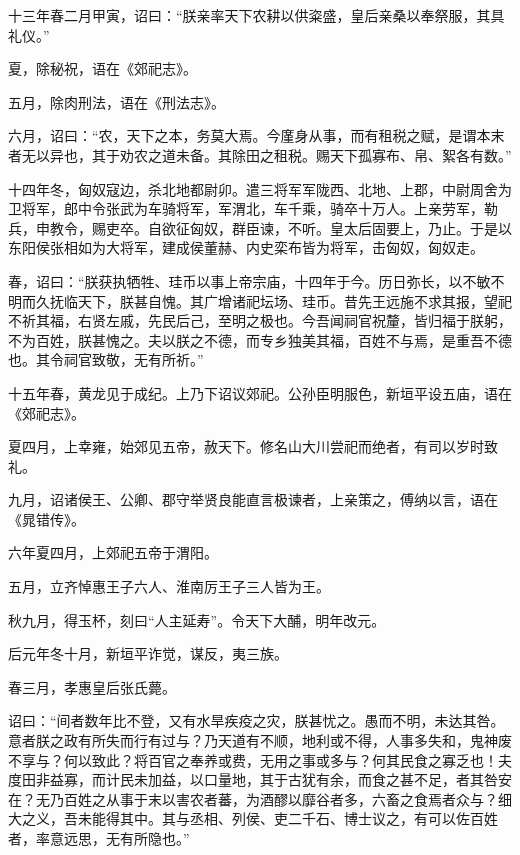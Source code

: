 \documentclass[12pt,UTF8]{ctexbook}
\begin{document}
十三年春二月甲寅，诏曰：“朕亲率天下农耕以供粢盛，皇后亲桑以奉祭服，其具礼仪。”



夏，除秘祝，语在《郊祀志》。



五月，除肉刑法，语在《刑法志》。



六月，诏曰：“农，天下之本，务莫大焉。今廑身从事，而有租税之赋，是谓本末者无以异也，其于劝农之道未备。其除田之租税。赐天下孤寡布、帛、絮各有数。”



十四年冬，匈奴寇边，杀北地都尉卯。遣三将军军陇西、北地、上郡，中尉周舍为卫将军，郎中令张武为车骑将军，军渭北，车千乘，骑卒十万人。上亲劳军，勒兵，申教令，赐吏卒。自欲征匈奴，群臣谏，不听。皇太后固要上，乃止。于是以东阳侯张相如为大将军，建成侯董赫、内史栾布皆为将军，击匈奴，匈奴走。



春，诏曰：“朕获执牺牲、珪币以事上帝宗庙，十四年于今。历日弥长，以不敏不明而久抚临天下，朕甚自愧。其广增诸祀坛场、珪币。昔先王远施不求其报，望祀不祈其福，右贤左戚，先民后己，至明之极也。今吾闻祠官祝釐，皆归福于朕躬，不为百姓，朕甚愧之。夫以朕之不德，而专乡独美其福，百姓不与焉，是重吾不德也。其令祠官致敬，无有所祈。”



十五年春，黄龙见于成纪。上乃下诏议郊祀。公孙臣明服色，新垣平设五庙，语在《郊祀志》。



夏四月，上幸雍，始郊见五帝，赦天下。修名山大川尝祀而绝者，有司以岁时致礼。



九月，诏诸侯王、公卿、郡守举贤良能直言极谏者，上亲策之，傅纳以言，语在《晁错传》。



六年夏四月，上郊祀五帝于渭阳。



五月，立齐悼惠王子六人、淮南厉王子三人皆为王。



秋九月，得玉杯，刻曰“人主延寿”。令天下大酺，明年改元。



后元年冬十月，新垣平诈觉，谋反，夷三族。



春三月，孝惠皇后张氏薨。



诏曰：“间者数年比不登，又有水旱疾疫之灾，朕甚忧之。愚而不明，未达其咎。意者朕之政有所失而行有过与？乃天道有不顺，地利或不得，人事多失和，鬼神废不享与？何以致此？将百官之奉养或费，无用之事或多与？何其民食之寡乏也！夫度田非益寡，而计民未加益，以口量地，其于古犹有余，而食之甚不足，者其咎安在？无乃百姓之从事于末以害农者蕃，为酒醪以靡谷者多，六畜之食焉者众与？细大之义，吾未能得其中。其与丞相、列侯、吏二千石、博士议之，有可以佐百姓者，率意远思，无有所隐也。”
\end{document}
